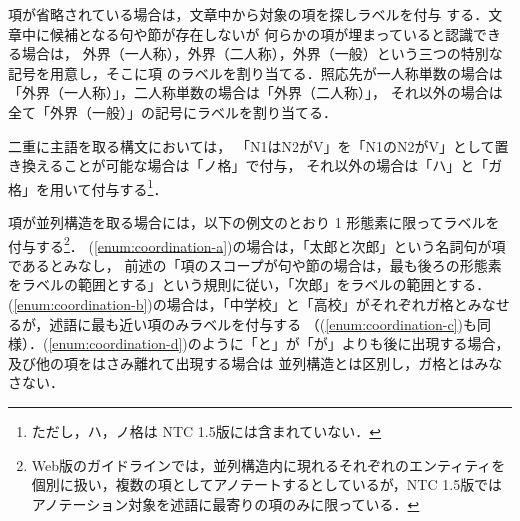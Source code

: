 \documentclass[japanese]{jnlp_1.4}
\begin{document}
項が省略されている場合は，文章中から対象の項を探しラベルを付与
する．文章中に候補となる句や節が存在しないが
何らかの項が埋まっていると認識できる場合は，
外界（一人称），外界（二人称），外界（一般）という三つの特別な記号を用意し，そこに項
のラベルを割り当てる．照応先が一人称単数の場合は「外界（一人称）」，二人称単数の場合は「外界（二人称）」，
それ以外の場合は全て「外界（一般）」の記号にラベルを割り当てる．

二重に主語を取る構文においては，
「N1はN2がV」を「N1のN2がV」として置き換えることが可能な場合は「ノ格」で付与，
それ以外の場合は「ハ」と「ガ格」を用いて付与する\footnote{ただし，ハ，ノ格は
NTC 1.5版には含まれていない．}．

項が並列構造を取る場合には，以下の例文のとおり 1 形態素に限ってラベルを付与する\footnote{Web版のガイドラインでは，並列構造内に現れるそれぞれのエンティティを個別に扱い，複数の項としてアノテートするとしているが，NTC 1.5版ではアノテーション対象を述語に最寄りの項のみに限っている．}．
(\ref{enum:coordination-a})の場合は，「太郎と次郎」という名詞句が項であるとみなし，
前述の「項のスコープが句や節の場合は，最も後ろの形態素をラベルの範囲とする」という規則に従い，「次郎」をラベルの範囲とする．
(\ref{enum:coordination-b})の場合は，「中学校」と「高校」がそれぞれガ格とみなせるが，述語に最も近い項のみラベルを付与する
（(\ref{enum:coordination-c})も同様）．(\ref{enum:coordination-d})のように「と」が「が」よりも後に出現する場合，及び他の項をはさみ離れて出現する場合は
並列構造とは区別し，ガ格とはみなさない．
\end{document}
